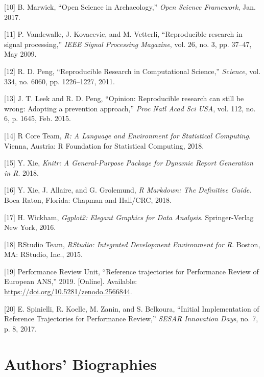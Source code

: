 \documentclass[conference,final,a4paper,]{IEEEtran}
\begin{document}
\hypertarget{ref-marwick_2017}{}
{[}10{]} B. Marwick, ``Open Science in Archaeology,'' \emph{Open Science
Framework}, Jan. 2017.

\hypertarget{ref-vandewalle_2009}{}
{[}11{]} P. Vandewalle, J. Kovacevic, and M. Vetterli, ``Reproducible
research in signal processing,'' \emph{IEEE Signal Processing Magazine},
vol. 26, no. 3, pp. 37--47, May 2009.

\hypertarget{ref-Peng1226}{}
{[}12{]} R. D. Peng, ``Reproducible Research in Computational Science,''
\emph{Science}, vol. 334, no. 6060, pp. 1226--1227, 2011.

\hypertarget{ref-leek_2015}{}
{[}13{]} J. T. Leek and R. D. Peng, ``Opinion: Reproducible research can
still be wrong: Adopting a prevention approach,'' \emph{Proc Natl Acad
Sci USA}, vol. 112, no. 6, p. 1645, Feb. 2015.

\hypertarget{ref-rcoreteam_2018}{}
{[}14{]} R Core Team, \emph{R: A Language and Environment for
Statistical Computing}. Vienna, Austria: R Foundation for Statistical
Computing, 2018.

\hypertarget{ref-R-knitr}{}
{[}15{]} Y. Xie, \emph{Knitr: A General-Purpose Package for Dynamic
Report Generation in R}. 2018.

\hypertarget{ref-xie2018}{}
{[}16{]} Y. Xie, J. Allaire, and G. Grolemund, \emph{R Markdown: The
Definitive Guide}. Boca Raton, Florida: Chapman and Hall/CRC, 2018.

\hypertarget{ref-wickham_2016}{}
{[}17{]} H. Wickham, \emph{Ggplot2: Elegant Graphics for Data Analysis}.
Springer-Verlag New York, 2016.

\hypertarget{ref-rstudioteam_2015}{}
{[}18{]} RStudio Team, \emph{RStudio: Integrated Development Environment
for R}. Boston, MA: RStudio, Inc., 2015.

\hypertarget{ref-performancereviewunit_2019}{}
{[}19{]} Performance Review Unit, ``Reference trajectories for
Performance Review of European ANS,'' 2019. {[}Online{]}. Available:
\url{https://doi.org/10.5281/zenodo.2566844}.

\hypertarget{ref-spinielli_2017}{}
{[}20{]} E. Spinielli, R. Koelle, M. Zanin, and S. Belkoura, ``Initial
Implementation of Reference Trajectories for Performance Review,''
\emph{SESAR Innovation Days}, no. 7, p. 8, 2017.

\setlength{\parskip}{6pt}

\vspace*{1\baselineskip}
\hypertarget{biographies}{%
\section*{Authors' Biographies}\label{biographies}}
\end{document}
